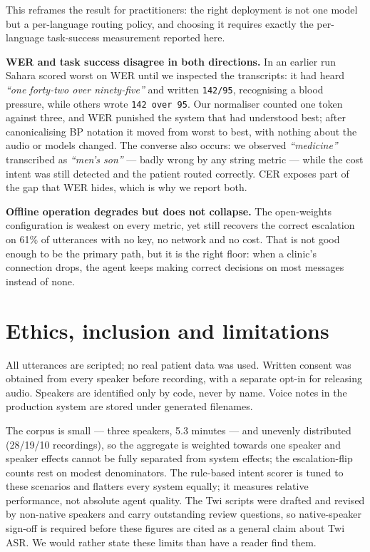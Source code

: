 \documentclass[a4paper,10pt,twocolumn]{article}
\begin{document}
This reframes the result for practitioners: the right deployment is not one model
but a per-language routing policy, and choosing it requires exactly the
per-language task-success measurement reported here.

\textbf{WER and task success disagree in both directions.} In an earlier run
Sahara scored worst on WER until we inspected the transcripts: it had heard
\emph{``one forty-two over ninety-five''} and written \texttt{142/95},
recognising a blood pressure, while others wrote \texttt{142 over 95}. Our
normaliser counted one token against three, and WER punished the system that had
understood best; after canonicalising BP notation it moved from worst to best,
with nothing about the audio or models changed. The converse also occurs: we
observed \emph{``medicine''} transcribed as \emph{``men's son''} --- badly wrong
by any string metric --- while the cost intent was still detected and the patient
routed correctly. CER exposes part of the gap that WER hides, which is why we
report both.

\textbf{Offline operation degrades but does not collapse.} The open-weights
configuration is weakest on every metric, yet still recovers the correct
escalation on 61\% of utterances with no key, no network and no cost. That is not
good enough to be the primary path, but it is the right floor: when a clinic's
connection drops, the agent keeps making correct decisions on most messages
instead of none.

\section{Ethics, inclusion and limitations}

All utterances are scripted; no real patient data was used. Written consent was
obtained from every speaker before recording, with a separate opt-in for
releasing audio. Speakers are identified only by code, never by name. Voice notes
in the production system are stored under generated filenames.

The corpus is small --- three speakers, 5.3 minutes --- and unevenly distributed
(28/19/10 recordings), so the aggregate is weighted towards one speaker and
speaker effects cannot be fully separated from system effects; the
escalation-flip counts rest on modest denominators. The rule-based intent scorer
is tuned to these scenarios and flatters every system equally; it measures
relative performance, not absolute agent quality. The Twi scripts were drafted
and revised by non-native speakers and carry outstanding review questions, so
native-speaker sign-off is required before these figures are cited as a general
claim about Twi ASR. We would rather state these limits than have a reader find
them.
\end{document}
